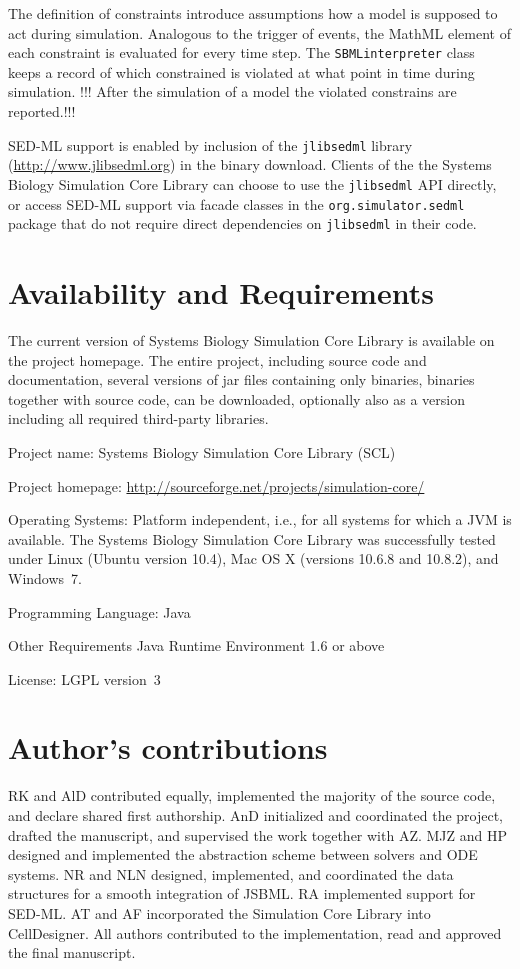 \documentclass[10pt]{bmc_article}
\newenvironment{bmcformat}{\baselineskip20pt\sloppy\setboolean{publ}{false}}{\baselineskip20pt\sloppy}
\newcommand{\SBMLinterpreter}{\texttt{SBML\-interpreter}}
\newcommand{\jlibsedml}{\texttt{jlibsedml}}
\begin{document}
\begin{bmcformat}
{The definition of constraints introduce assumptions how a model is supposed to act during simulation.
Analogous to the trigger of events, the MathML element of each constraint is evaluated for every time step. The \SBMLinterpreter{} class keeps a record of which constrained is violated at what point in time during simulation.
!!! After the simulation of a model the violated constrains are reported.!!!
}

SED-ML support is enabled by inclusion of the \jlibsedml{} library (\href{http://www.jlibsedml.org}{http://www.jlibsedml.org}) in the binary download. Clients of the the Systems Biology Simulation Core Library can choose to use the \jlibsedml{} API directly, or access SED-ML support via  facade classes in the \texttt{org.simulator.sedml} package that do not require direct dependencies on \jlibsedml{} in their code.


\section*{Availability and Requirements}
The current version of Systems Biology Simulation Core Library is available on the project homepage. The entire project, including source code and documentation, several versions of jar files containing only binaries, binaries together with source code, can be downloaded, optionally also as a version including all required third-party libraries.
\begin{description}
\item{Project name:}         Systems Biology Simulation Core Library (SCL)
\item{Project homepage:}     \url{http://sourceforge.net/projects/simulation-core/}
\item{Operating Systems:}    Platform independent, i.e., for all systems for which a JVM
is available. The Systems Biology Simulation Core Library was successfully 
tested under Linux (Ubuntu version 10.4), Mac OS X (versions 10.6.8 and 10.8.2),
and Windows~7.
\item{Programming Language:} Java\texttrademark
\item{Other Requirements}    Java Runtime Environment 1.6 or above
\item{License:}              LGPL version~3
\end{description}

\section*{Author's contributions}
RK and AlD contributed equally, implemented the majority of the source code, and
declare shared first authorship.
AnD initialized and coordinated the project, drafted the manuscript, and
supervised the work together with AZ.
MJZ and HP designed and implemented the abstraction scheme between solvers and
ODE systems.
NR and NLN designed, implemented, and coordinated the data structures for a
smooth integration of JSBML.
RA implemented support for SED-ML.
AT and AF incorporated the Simulation Core Library into CellDesigner.
All authors contributed to the implementation, read and approved the final
manuscript.
    


\end{bmcformat}
\end{document}
